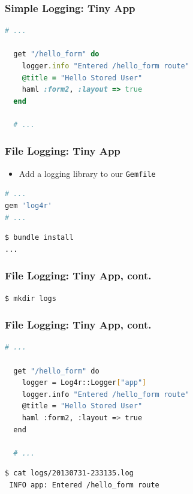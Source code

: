 \documentclass{beamer}
\begin{document}
\begin{frame}[fragile]\frametitle{Simple Logging: Tiny App}

  \begin{lstlisting}[language=ruby, escapechar={^}]
  # ...
  
  get "/hello_form" do
    logger.info "Entered /hello_form route"
    @title = "Hello Stored User"
    haml :form2, :layout => true
  end 
  
  # ...
  \end{lstlisting}

\end{frame}




\begin{frame}[fragile]\frametitle{File Logging: Tiny App} 

  \begin{itemize}
    \item Add a logging library to our \texttt{Gemfile}
  \end{itemize}
  \begin{lstlisting}[language=ruby, escapechar={^}]
# ...
gem 'log4r'
# ...
  \end{lstlisting}
  
  \begin{lstlisting}[language=bash, escapechar={^}]
$ bundle install
...
  \end{lstlisting}



\end{frame}




\begin{frame}[fragile]\frametitle{File Logging: Tiny App, cont.} 

  


  \begin{lstlisting}[language=bash, escapechar={^}]
$ mkdir logs
  \end{lstlisting}


\end{frame}



\begin{frame}[fragile]\frametitle{File Logging: Tiny App, cont.} 

  \begin{lstlisting}[language=bash, escapechar={^}]
  # ...
  
  get "/hello_form" do
    logger = Log4r::Logger["app"]
    logger.info "Entered /hello_form route"
    @title = "Hello Stored User"
    haml :form2, :layout => true
  end 
  
  # ...
  \end{lstlisting}

  \begin{lstlisting}[language=bash, escapechar={^}]
$ cat logs/20130731-233135.log 
 INFO app: Entered /hello_form route
  \end{lstlisting}

\end{frame}
\end{document}
